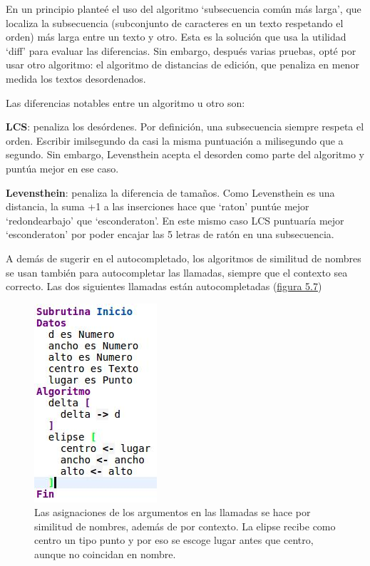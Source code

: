 \documentclass{report}
\begin{document}
	\vspace{10px}
	
	En un principio planteé el uso del algoritmo `subsecuencia común más larga'\cite{lcs}, que localiza la subsecuencia (subconjunto de caracteres en un texto respetando el orden) más larga entre un texto y otro. Esta es la solución que usa la utilidad `diff'\cite{diff} para evaluar las diferencias. Sin embargo, después varias pruebas, opté por usar otro algoritmo: el algoritmo de distancias de edición\cite{levensthein}, que penaliza en menor medida los textos desordenados.
	
	\vspace{10px}
	
	Las diferencias notables entre un algoritmo u otro son:
	
	\vspace{10px}
	
	\noindent
	\textbf{LCS}: penaliza los desórdenes. Por definición, una subsecuencia siempre respeta el orden. Escribir imilsegundo da casi la misma puntuación a milisegundo que a segundo. Sin embargo, Levensthein acepta el desorden como parte del algoritmo y puntúa mejor en ese caso.
	
	\vspace{10px}
	\noindent
	\textbf{Levensthein}: penaliza la diferencia de tamaños. Como Levensthein es una distancia, la suma +1 a las inserciones hace que `raton' puntúe mejor `redondearbajo' que `esconderaton'. En este mismo caso LCS puntuaría mejor `esconderaton' por poder encajar las 5 letras de ratón en una subsecuencia.
	
	\vspace{10px}
	
	A demás de sugerir en el autocompletado, los algoritmos de similitud de nombres se usan también para autocompletar las llamadas, siempre que el contexto sea correcto. Las dos siguientes llamadas están autocompletadas (\hyperref[fig:autocompletado2]{figura 5.7})
	
\begin{figure}
\centering
\includegraphics[width=0.4\linewidth]{autocompletado}
\caption[Autocompletado con filtro por tipos]{Las asignaciones de los argumentos en las llamadas se hace por similitud de nombres, además de por contexto. La elipse recibe como centro un tipo punto y por eso se escoge lugar antes que centro, aunque no coincidan en nombre.}
\label{fig:autocompletado2}
\end{figure}
\end{document}
